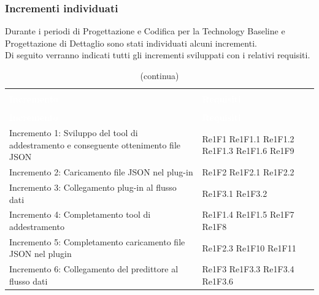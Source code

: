 \pagebreak
\subsubsection{Incrementi individuati}
Durante i periodi di Progettazione e Codifica per la Technology Baseline e Progettazione di Dettaglio sono stati individuati alcuni incrementi. \\
Di seguito verranno indicati tutti gli incrementi sviluppati con i relativi requisiti.

\begin{longtable}{C{4cm} L{3cm}}
\caption{Tracciamento incrementi} \\
\textcolor{white}{\textbf{Incremento}} &
\textcolor{white}{\textbf{Requisiti}} \\
		\endfirsthead
		\caption[]{(continua)} \\
\textcolor{white}{\textbf{Incremento}} &
\textcolor{white}{\textbf{Requisiti}} \\
		\endhead
Incremento 1: Sviluppo del tool di addestramento e conseguente ottenimento file JSON & Re1F1 \newline Re1F1.1  \newline Re1F1.2 \newline Re1F1.3 \newline Re1F1.6 \newline Re1F9 \\
Incremento 2: Caricamento file JSON	nel plug-in & Re1F2 \newline Re1F2.1 \newline Re1F2.2  \\
Incremento 3: Collegamento plug-in al flusso dati	& Re1F3.1 \newline Re1F3.2 \newline 
\\
Incremento 4: Completamento tool di addestramento & Re1F1.4 \newline Re1F1.5 \newline Re1F7 \newline Re1F8 
\\
Incremento 5: Completamento caricamento file JSON nel plugin & Re1F2.3 \newline Re1F10 \newline Re1F11
\\
Incremento 6: Collegamento del predittore al flusso dati & Re1F3 \newline Re1F3.3 \newline Re1F3.4 \newline Re1F3.6

\end{longtable}
